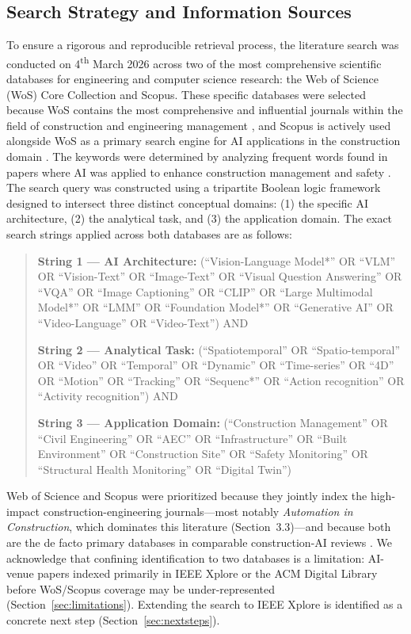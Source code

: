 \documentclass[10pt,letterpaper]{article}
\begin{document}
\subsection{Search Strategy and Information Sources}

To ensure a rigorous and reproducible retrieval process, the literature search was conducted on 4\textsuperscript{th} March 2026 across two of the most comprehensive scientific databases for engineering and computer science research: the Web of Science (WoS) Core Collection and Scopus. These specific databases were selected because WoS contains the most comprehensive and influential journals within the field of construction and engineering management \cite{zhong2019}, and Scopus is actively used alongside WoS as a primary search engine for AI applications in the construction domain \cite{rabbi2024}. The keywords were determined by analyzing frequent words found in papers where AI was applied to enhance construction management and safety \cite{rabbi2024}. The search query was constructed using a tripartite Boolean logic framework designed to intersect three distinct conceptual domains: (1) the specific AI architecture, (2) the analytical task, and (3) the application domain. The exact search strings applied across both databases are as follows:

\begin{quote}
\textbf{String 1 --- AI Architecture:} (``Vision-Language Model*'' OR ``VLM'' OR ``Vision-Text'' OR ``Image-Text'' OR ``Visual Question Answering'' OR ``VQA'' OR ``Image Captioning'' OR ``CLIP'' OR ``Large Multimodal Model*'' OR ``LMM'' OR ``Foundation Model*'' OR ``Generative AI'' OR ``Video-Language'' OR ``Video-Text'') AND

\textbf{String 2 --- Analytical Task:} (``Spatiotemporal'' OR ``Spatio-temporal'' OR ``Video'' OR ``Temporal'' OR ``Dynamic'' OR ``Time-series'' OR ``4D'' OR ``Motion'' OR ``Tracking'' OR ``Sequenc*'' OR ``Action recognition'' OR ``Activity recognition'') AND

\textbf{String 3 --- Application Domain:} (``Construction Management'' OR ``Civil Engineering'' OR ``AEC'' OR ``Infrastructure'' OR ``Built Environment'' OR ``Construction Site'' OR ``Safety Monitoring'' OR ``Structural Health Monitoring'' OR ``Digital Twin'')
\end{quote}

Web of Science and Scopus were prioritized because they jointly index the high-impact construction-engineering journals---most notably \textit{Automation in Construction}, which dominates this literature (Section~3.3)---and because both are the de facto primary databases in comparable construction-AI reviews \cite{zhong2019,rabbi2024}. We acknowledge that confining identification to two databases is a limitation: AI-venue papers indexed primarily in IEEE Xplore or the ACM Digital Library before WoS/Scopus coverage may be under-represented (Section~\ref{sec:limitations}). Extending the search to IEEE Xplore is identified as a concrete next step (Section~\ref{sec:nextsteps}).
\end{document}
